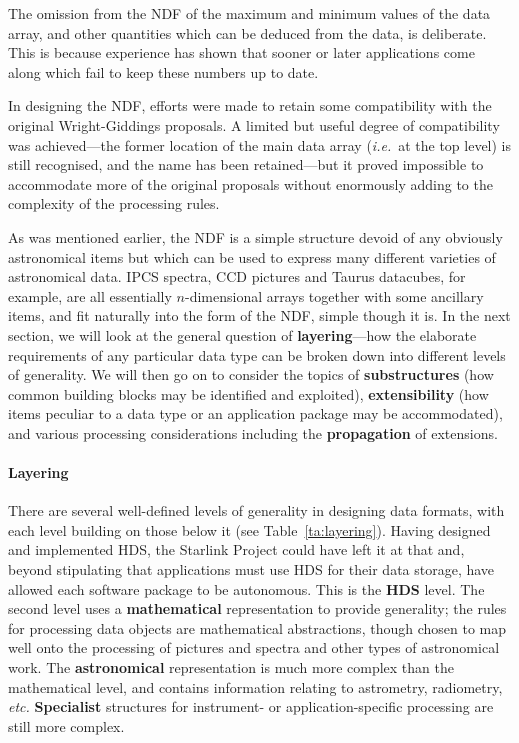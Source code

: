 \documentclass[twoside,11pt]{article}
\renewcommand{\_}{\texttt{\symbol{95}}}
\begin{document}
The omission from the NDF of the maximum and minimum
values of the data array, and other quantities which can be
deduced from the data, is deliberate.  This is
because experience has shown that sooner or later
applications come along which fail to keep these
numbers up to date.

In designing the NDF, efforts were made
to retain some compatibility
with the original Wright-Giddings proposals.  A limited but
useful degree of compatibility was achieved---the former
location of the main data array ({\it i.e.}\ at the top level) is
still recognised, and the name has been
retained---but it proved impossible to accommodate more
of the original proposals without enormously
adding to the complexity of the processing rules.

As was mentioned earlier, the NDF is a simple structure devoid
of any obviously astronomical items but which can be used
to express many different varieties of astronomical
data.  IPCS spectra, CCD pictures and Taurus datacubes, for example,
are all essentially $n$-dimensional arrays together with
some ancillary items, and fit naturally into the
form of the NDF, simple though it is.
In the next section, we will look at the
general question of {\bf layering}---how the
elaborate requirements of any particular data type can
be broken down into different levels of generality.  We
will then go on to consider
the topics of {\bf substructures} (how
common building blocks may be identified and exploited),
{\bf extensibility} (how items peculiar to a data type
or an application package may be accommodated), and
various processing considerations including the
{\bf propagation} of extensions.

\paragraph{Layering}
There are several well-defined levels of generality in designing
data formats, with each level building on those below it (see
Table~\ref{ta:layering}).  Having designed and implemented
HDS, the Starlink Project could have left it at that and,
beyond stipulating that applications must use HDS for their
data storage, have allowed each software package
to be autonomous.
This is the {\bf HDS} level.
The second level uses a {\bf mathematical}
representation to provide generality;  the rules for processing data
objects are mathematical abstractions, though chosen to map
well onto the processing of pictures and spectra and other
types of astronomical work.  The {\bf astronomical}
representation is much more complex than the mathematical level,
and contains information relating to astrometry, radiometry,
{\it etc.}
{\bf Specialist} structures for instrument- or application-specific
processing are still more complex.
\end{document}
